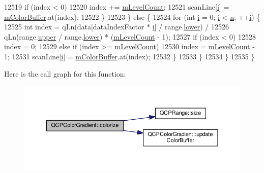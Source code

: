 \begin{DoxyCode}
12519         \textcolor{keywordflow}{if} (index < 0)
12520           index += \hyperlink{class_q_c_p_color_gradient_a98fb68e359904b2c991fcae3e38a211a}{mLevelCount};
12521         scanLine[\hyperlink{_comparision_pictures_2_createtest_image_8m_a6f6ccfcf58b31cb6412107d9d5281426}{i}] = \hyperlink{class_q_c_p_color_gradient_af8b5f0739faa5f8295154d47ce38ecff}{mColorBuffer}.at(index);
12522       \}
12523     \} \textcolor{keywordflow}{else} \{
12524       \textcolor{keywordflow}{for} (\textcolor{keywordtype}{int} \hyperlink{_comparision_pictures_2_createtest_image_8m_a6f6ccfcf58b31cb6412107d9d5281426}{i} = 0; \hyperlink{_comparision_pictures_2_createtest_image_8m_a6f6ccfcf58b31cb6412107d9d5281426}{i} < \hyperlink{_comparision_pictures_2_createtest_image_8m_aeab71244afb687f16d8c4f5ee9d6ef0e}{n}; ++\hyperlink{_comparision_pictures_2_createtest_image_8m_a6f6ccfcf58b31cb6412107d9d5281426}{i}) \{
12525         \textcolor{keywordtype}{int} index = qLn(data[dataIndexFactor * \hyperlink{_comparision_pictures_2_createtest_image_8m_a6f6ccfcf58b31cb6412107d9d5281426}{i}] / range.\hyperlink{class_q_c_p_range_aa3aca3edb14f7ca0c85d912647b91745}{lower}) /
12526                     qLn(range.\hyperlink{class_q_c_p_range_ae44eb3aafe1d0e2ed34b499b6d2e074f}{upper} / range.\hyperlink{class_q_c_p_range_aa3aca3edb14f7ca0c85d912647b91745}{lower}) * (\hyperlink{class_q_c_p_color_gradient_a98fb68e359904b2c991fcae3e38a211a}{mLevelCount} - 1);
12527         \textcolor{keywordflow}{if} (index < 0)
12528           index = 0;
12529         \textcolor{keywordflow}{else} \textcolor{keywordflow}{if} (index >= \hyperlink{class_q_c_p_color_gradient_a98fb68e359904b2c991fcae3e38a211a}{mLevelCount})
12530           index = \hyperlink{class_q_c_p_color_gradient_a98fb68e359904b2c991fcae3e38a211a}{mLevelCount} - 1;
12531         scanLine[\hyperlink{_comparision_pictures_2_createtest_image_8m_a6f6ccfcf58b31cb6412107d9d5281426}{i}] = \hyperlink{class_q_c_p_color_gradient_af8b5f0739faa5f8295154d47ce38ecff}{mColorBuffer}.at(index);
12532       \}
12533     \}
12534   \}
12535 \}
\end{DoxyCode}


Here is the call graph for this function\+:\nopagebreak
\begin{figure}[H]
\begin{center}
\leavevmode
\includegraphics[width=350pt]{class_q_c_p_color_gradient_aaf423ceb943e177b0ed2c48c811d83dc_cgraph}
\end{center}
\end{figure}




